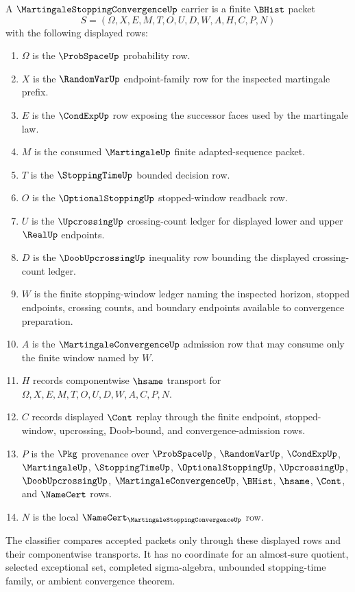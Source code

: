 \begin{definition}
\label{def:martingale-stopping-convergence-carrier}
A $\MartingaleStoppingConvergenceUp$ carrier is a finite $\BHist$ packet
$$
S=(\Omega,X,E,M,T,O,U,D,W,A,H,C,P,N)
$$
with the following displayed rows:
\begin{enumerate}
\item $\Omega$ is the $\ProbSpaceUp$ probability row.
\item $X$ is the $\RandomVarUp$ endpoint-family row for the inspected martingale prefix.
\item $E$ is the $\CondExpUp$ row exposing the successor faces used by the martingale law.
\item $M$ is the consumed $\MartingaleUp$ finite adapted-sequence packet.
\item $T$ is the $\StoppingTimeUp$ bounded decision row.
\item $O$ is the $\OptionalStoppingUp$ stopped-window readback row.
\item $U$ is the $\UpcrossingUp$ crossing-count ledger for displayed lower and upper $\RealUp$ endpoints.
\item $D$ is the $\DoobUpcrossingUp$ inequality row bounding the displayed crossing-count ledger.
\item $W$ is the finite stopping-window ledger naming the inspected horizon, stopped endpoints, crossing counts, and boundary endpoints available to convergence preparation.
\item $A$ is the $\MartingaleConvergenceUp$ admission row that may consume only the finite window named by $W$.
\item $H$ records componentwise $\hsame$ transport for $\Omega,X,E,M,T,O,U,D,W,A,C,P,N$.
\item $C$ records displayed $\Cont$ replay through the finite endpoint, stopped-window, upcrossing, Doob-bound, and convergence-admission rows.
\item $P$ is the $\Pkg$ provenance over $\ProbSpaceUp$, $\RandomVarUp$, $\CondExpUp$, $\MartingaleUp$, $\StoppingTimeUp$, $\OptionalStoppingUp$, $\UpcrossingUp$, $\DoobUpcrossingUp$, $\MartingaleConvergenceUp$, $\BHist$, $\hsame$, $\Cont$, and $\NameCert$ rows.
\item $N$ is the local $\NameCert_{\MartingaleStoppingConvergenceUp}$ row.
\end{enumerate}
The classifier compares accepted packets only through these displayed rows and their componentwise transports. It has no coordinate for an almost-sure quotient, selected exceptional set, completed sigma-algebra, unbounded stopping-time family, or ambient convergence theorem.
\end{definition}


